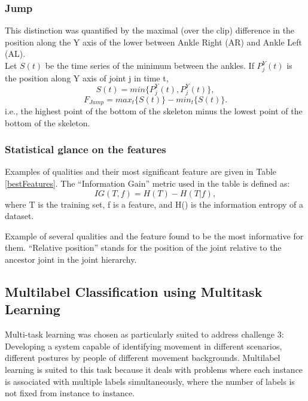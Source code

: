 \documentclass{sigchi}
\begin{document}
\subsubsection{Jump}
This distinction was quantified by the maximal (over the clip) difference in the position along the Y axis of the lower between Ankle Right (AR) and Ankle Left (AL). 
\\Let $S(t)$ be the time series of the minimum between the ankles.
If $P_{j}^{Y}(t)$ is the position along Y axis of joint j in time t,
\begin{equation*}
S(t) = min\{P_{j}^{Y}(t), P_{j}^{Y}(t)\},
\end{equation*}
\begin{equation*}
F_{Jump} = max_{t}\{S(t)\} - min_t\{S(t)\}.
\end{equation*}
i.e., the highest point of the bottom of the skeleton minus the lowest point of the bottom of the skeleton.

\subsubsection{Statistical glance on the features}
Examples of qualities and their most significant feature are given in 
Table \ref{bestFeatures}. The ``Information Gain'' metric used
in the table is defined as:
\begin{equation*}
       IG(T,f) = H(T) - H(T|f),
\end{equation*}
where T is the training set, f is a feature, and H() is the information
entropy of a dataset.
\begin{table}
   \centering
   \caption{Example of several qualities and the feature found to be
   the most informative for them. ``Relative position'' stands for the
   position of the joint relative to the ancestor joint in the joint
   hierarchy.}
   \label{bestFeatures}
\end{table}

\subsection{Multilabel Classification using Multitask Learning}
 

Multi-task learning was chosen as particularly suited to address challenge 3:  Developing a system capable of identifying movement in different scenarios, different postures by people of different movement backgrounds. Multilabel learning is suited to this task because it deals with problems where each instance is associated with multiple labels simultaneously, where the number of labels is not fixed from instance to instance. 
\end{document}
